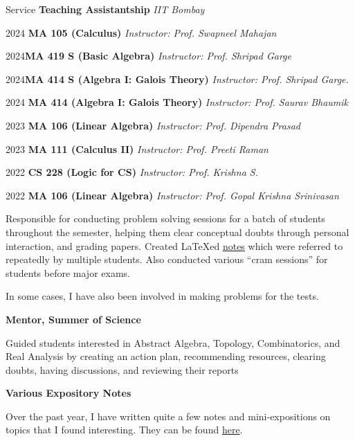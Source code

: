 
\begin{rubric}{Service}
	\entry*[2022--2024] \textbf{Teaching Assistantship} \hfill \emph{IIT Bombay}

	   2024 \quad \textbf{MA 105 (Calculus)} \hfill \emph{Instructor: Prof. Swapneel Mahajan}

	   2024\quad \textbf{MA 419 S (Basic Algebra)} \hfill \emph{Instructor: Prof. Shripad Garge}

	   2024\quad \textbf{MA 414 S (Algebra I: Galois Theory)} \hfill \emph{Instructor: Prof. Shripad Garge.}

	   2024 \quad \textbf{MA 414 (Algebra I: Galois Theory)} \hfill  \emph{Instructor: Prof. Saurav Bhaumik}

	   2023 \quad \textbf{MA 106 (Linear Algebra)} \hfill \emph{Instructor: Prof. Dipendra Prasad}

	   2023 \quad \textbf{MA 111 (Calculus II)} \hfill \emph{Instructor: Prof. Preeti Raman}
	   
	   2022 \quad \textbf{CS 228 (Logic for CS)} \hfill  \emph{Instructor: Prof. Krishna S.}
	   
	   2022 \quad \textbf{MA 106 (Linear Algebra)} \hfill \emph{Instructor: Prof. Gopal Krishna Srinivasan}

	    Responsible for conducting problem solving sessions for a batch of students throughout the semester, helping them clear conceptual doubts through personal interaction, and grading papers. 
		Created \LaTeX ed \href{https://swayamchube.github.io/notes}{notes} which were referred to repeatedly by multiple students. Also conducted various ``cram sessions'' for students before major exams.

		In some cases, I have also been involved in making problems for the tests.

	\entry*[2023, 2024] \textbf{Mentor, Summer of Science}

		Guided students interested in Abstract Algebra, Topology, Combinatorics, and Real Analysis by creating an action plan, recommending resources, clearing doubts, having discussions, and reviewing their reports	

	\entry*[] \textbf{Various Expository Notes}

		Over the past year, I have written quite a few notes and mini-expositions on topics that I found interesting. They can be found \href{https://swayamchube.github.io/notes}{here}.
\end{rubric}